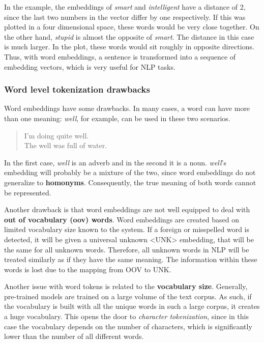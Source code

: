 In the example, the embeddings of \emph{smart} and \emph{intelligent} have a distance of 2, since the last two numbers in the vector differ by one respectively. If this was plotted in a four dimensional space, these words would be very close together. On the other hand, \emph{stupid} is almost the opposite of \emph{smart}. The distance in this case is much larger. In the plot, these words would sit roughly in opposite directions. Thus, with word embeddings, a sentence is transformed into a sequence of embedding vectors, which is very useful for NLP tasks.

\subsubsection{Word level tokenization drawbacks}

Word embeddings have some drawbacks. In many cases, a word can have more than one meaning: \emph{well}, for example, can be used in these two scenarios.

\begin{quote}
    I'm doing quite well.\\
    The well was full of water.
\end{quote}

In the first case, \textit{well} is an adverb and in the second it is a noun. \emph{well}'s embedding will probably be a mixture of the two, since word embeddings do not generalize to \textbf{homonyms}. Consequently, the true meaning of both words cannot be represented.

Another drawback is that word embeddings are not well equipped to deal with \textbf{out of vocabulary (oov) words}. Word embeddings are created based on limited vocabulary size known to the system. If a foreign or misspelled word is detected, it will be given a universal unknown <UNK> embedding, that will be the same for all unknown words. Therefore, all unknown words in NLP will be treated similarly as if they have the same meaning. The information within these words is lost due to the mapping from OOV to UNK.

Another issue with word tokens is related to the \textbf{vocabulary size}. Generally, pre-trained models are trained on a large volume of the text corpus. As such, if the vocabulary is built with all the unique words in such a large corpus, it creates a huge vocabulary. This opens the door to \emph{character tokenization}, since in this case the vocabulary depends on the number of characters, which is significantly lower than the number of all different words.

